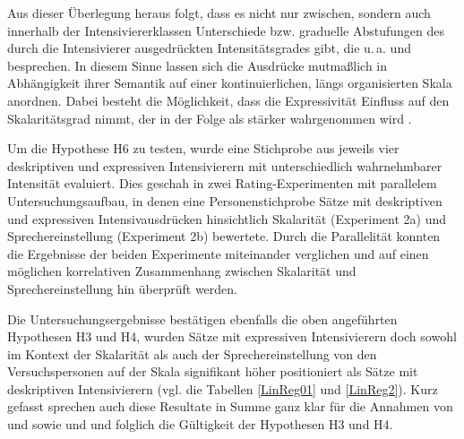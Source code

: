 \noindent Aus dieser Überlegung heraus folgt, dass es nicht nur zwischen, sondern auch innerhalb der Intensiviererklassen Unterschiede bzw. graduelle Abstufungen des durch die Intensivierer ausgedrückten Intensitätsgrades gibt, die u.\,a. \citet[87]{Biedermann.1969} und \citet[408]{Breindl.2007} besprechen. In diesem Sinne lassen sich die Ausdrücke mutmaßlich in Abhängigkeit ihrer Semantik auf einer kontinuierlichen, längs organisierten Skala anordnen. Dabei besteht die Möglichkeit, dass die Expressivität Einfluss auf den Skalaritätsgrad nimmt, der in der Folge als stärker wahrgenommen wird \citep[vgl.][133]{Gutzmann.2019a}.


Um die Hypothese H6 zu testen, wurde eine Stichprobe aus jeweils vier deskriptiven und expressiven Intensivierern mit unterschiedlich wahrnehmbarer Intensität evaluiert. Dies geschah in zwei Rating-Experimenten mit parallelem Untersuchungsaufbau, in denen eine Personenstichprobe Sätze mit deskriptiven und expressiven Intensivausdrücken hinsichtlich Skalarität (Experiment 2a) und Sprechereinstellung (Experiment 2b) bewertete. Durch die Parallelität konnten die Ergebnisse der beiden Experimente miteinander verglichen und auf einen möglichen korrelativen Zusammenhang zwischen Skalarität und Sprechereinstellung hin überprüft werden.


Die Untersuchungsergebnisse bestätigen ebenfalls die oben angeführten Hypothesen H3 und H4, wurden Sätze mit expressiven Intensivierern doch sowohl im Kontext der Skalarität als auch der Sprechereinstellung von den Versuchspersonen auf der Skala signifikant höher positioniert als Sätze mit deskriptiven Intensivierern (vgl. die Tabellen \ref{LinReg01} und \ref{LinReg2}). Kurz gefasst sprechen auch diese Resultate in Summe ganz klar für die Annahmen von \citet[22]{Paradis.1997} und \citet[133]{Gutzmann.2019a} sowie \citet[315]{Lang.1983} und \citet[57]{Ortner.2014} und folglich die Gültigkeit der Hypothesen H3 und H4.




